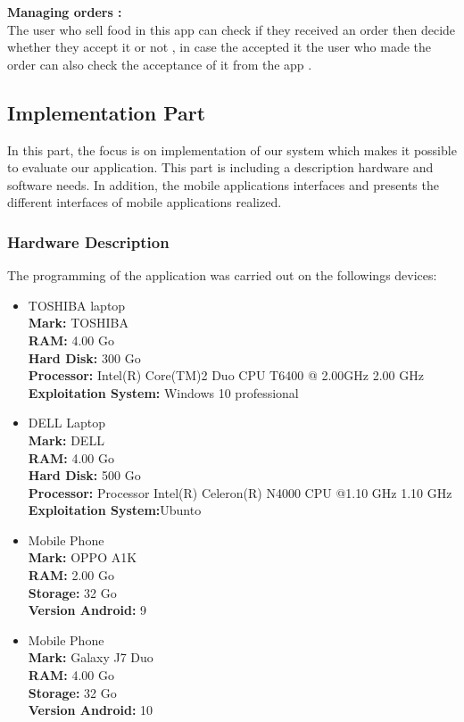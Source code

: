 \textbullet\textbf{Managing orders :}\\
The user who sell food in this app can check if they received an order then decide whether they accept it or not , in case the accepted it the user who made the order can also check the acceptance of it from the app .   



\newpage
\subsection{Implementation Part}
In this part, the focus is on implementation of our system which makes it possible to evaluate our application. This part is including a description hardware and software needs. In addition, the mobile applications interfaces and presents the different interfaces of mobile applications realized.

\subsubsection{Hardware Description}
The programming of the application was carried out on  the followings devices:
\begin{itemize}
	\item TOSHIBA laptop\\
\textbf{Mark:} TOSHIBA \\
\textbf{RAM:} 4.00 Go\\
\textbf{Hard Disk:} 300 Go\\
\textbf{Processor:} Intel(R) Core(TM)2 Duo CPU T6400 @ 2.00GHz 2.00 GHz\\
\textbf{Exploitation System:} Windows 10 professional
\item DELL Laptop\\
\textbf{Mark:} DELL \\
\textbf{RAM:} 4.00 Go\\
\textbf{Hard Disk:} 500 Go\\
\textbf{Processor:} Processor	Intel(R) Celeron(R) N4000 CPU @1.10 GHz 1.10 GHz\\
\textbf{Exploitation System:}Ubunto
\item Mobile Phone \\
\textbf{Mark:} OPPO A1K \\
\textbf{RAM:} 2.00 Go\\
\textbf{Storage:} 32 Go\\
\textbf{Version Android:} 9
\item Mobile Phone \\
\textbf{Mark:} Galaxy J7 Duo \\
\textbf{RAM:} 4.00 Go\\
\textbf{Storage:} 32 Go\\
\textbf{Version Android:} 10
\end{itemize}

